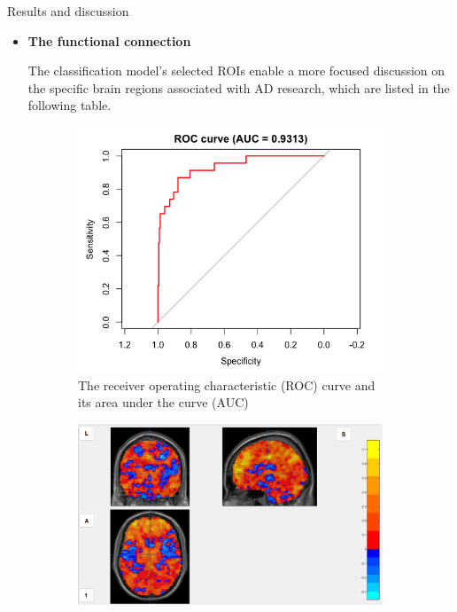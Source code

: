 \documentclass[final]{beamer}
\newlength{\colwidth}
\begin{document}
\begin{frame}[t]
\begin{columns}[t]
\begin{column}{\colwidth}
\begin{block}{Results and discussion}
\begin{itemize}
    The classification model demonstrated strong performance, achieving an AUC of 0.9313, which indicates high accuracy in distinguishing between AD and CN.


    \item \textbf{The functional connection}

    The classification model's selected ROIs enable a more focused discussion on the specific brain regions associated with AD research, which are listed in the following table.

    
    
\end{itemize}



\begin{figure}[ht]
    \centering
    \begin{subfigure}{0.4\textwidth}
        \centering
        \includegraphics[width=\linewidth]{images/ROC.png}
        \caption{The receiver operating characteristic (ROC) curve and its area under the curve (AUC)}
        \label{fig:sub1}
    \end{subfigure}%
    \hfill
    \begin{subfigure}{0.5\textwidth}
        \centering
        \includegraphics[width=\linewidth]{images/Brain.png}

\end{subfigure}
\end{figure}
\end{block}
\end{column}
\end{columns}
\end{frame}
\end{document}
